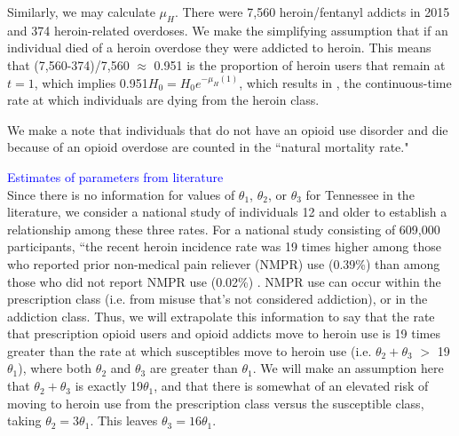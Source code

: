\documentclass[12pt]{article}
\begin{document}
Similarly, we may calculate $\mu_{H}$. There were 7,560 heroin/fentanyl addicts in 2015 and 374 heroin-related overdoses. We make the simplifying assumption that if an individual died of a heroin overdose they were addicted to heroin. This means that (7,560-374)/7,560 $\approx$ 0.951 is the proportion of heroin users that remain at $t=1$, which implies 0.951$H_0=H_0 e^{-\mu_{H}(1)}$, which results in  \unboldmath, the continuous-time rate at which individuals are dying from the heroin class.


We make a note that individuals that do not have an opioid use disorder and die because of an opioid overdose are counted in the ``natural mortality rate." 

\textcolor{blue}{Estimates of parameters from literature} \\
Since there is no information for values of $\theta_1$, $\theta_2$, or $\theta_3$ for Tennessee in the literature, we consider a national study of individuals 12 and older to establish a relationship among these three rates. For a national study consisting of 609,000 participants, ``the recent heroin incidence rate was 19 times higher among those who reported prior non-medical pain reliever (NMPR) use (0.39\%) than among those who did not report NMPR use (0.02\%) \cite{Muhuri}.
NMPR use can occur within the prescription class (i.e. from misuse that's not considered addiction), or in the addiction class. Thus, we will extrapolate this information to say that the rate that prescription opioid users and opioid addicts move to heroin use is 19 times greater than the rate at which susceptibles move to heroin use (i.e. $\theta_2 + \theta_3$ $>$ 19$\theta_1$), where both $\theta_2$ and $\theta_3$ are greater than $\theta_1.$ We will make an assumption here that $\theta_2 + \theta_3$ is exactly 19$\theta_1$, and that there is somewhat of an elevated risk of moving to heroin use from the prescription class versus the susceptible class, taking $\theta_2 =3 \theta_1$. This leaves $\theta_3=16\theta_1.$ \\
\end{document}
